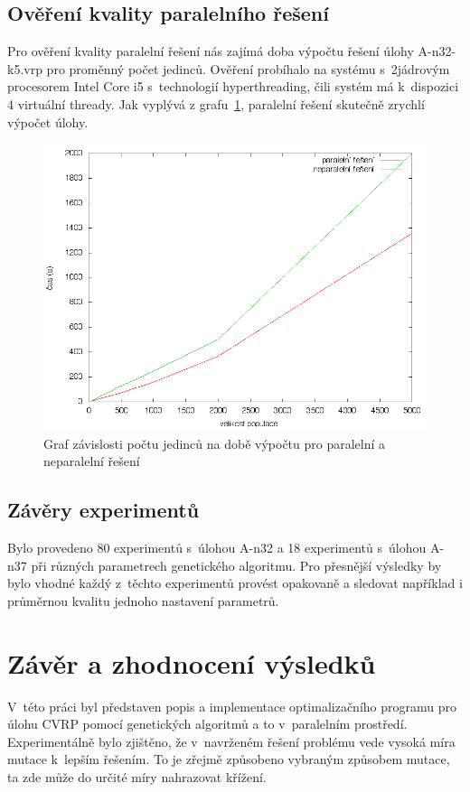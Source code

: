 \documentclass[a4paper]{article}
\begin{document}
\subsection{Ověření kvality paralelního řešení}

Pro ověření kvality paralelní řešení nás zajímá doba výpočtu řešení úlohy A-n32-k5.vrp pro proměnný počet jedinců. Ověření probíhalo na systému s~2jádrovým procesorem Intel Core i5 s~technologií hyperthreading, čili systém má k~dispozici 4 virtuální thready. Jak vyplývá z grafu~\ref{fig:procesory}, paralelní řešení skutečně zrychlí výpočet úlohy.

\begin{figure}
\centering
\includegraphics[width=\textwidth]{procesory.png}
\caption{Graf závislosti počtu jedinců na době výpočtu pro paralelní a neparalelní řešení\label{fig:procesory}}
\end{figure}

\subsection{Závěry experimentů}
Bylo provedeno 80 experimentů s~úlohou A-n32 a 18 experimentů s~úlohou A-n37 při různých parametrech genetického algoritmu. Pro přesnější výsledky by bylo vhodné každý z~těchto experimentů provést opakovaně a sledovat například i průměrnou kvalitu jednoho nastavení parametrů.

\section{Závěr a zhodnocení výsledků}
V~této práci byl představen popis a implementace optimalizačního programu pro úlohu CVRP pomocí genetických algoritmů a to v~paralelním prostředí. Experimentálně bylo zjištěno, že v~navrženém řešení problému vede vysoká míra mutace k~lepším řešením. To je zřejmě způsobeno vybraným způsobem mutace, ta zde může do určité míry nahrazovat křížení.
\end{document}
